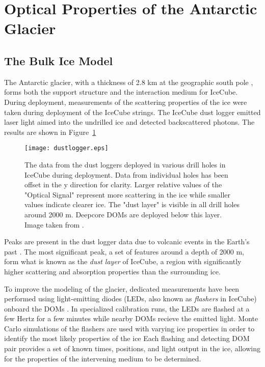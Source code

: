 \section{Optical Properties of the Antarctic Glacier}

\label{subsec:bulk_ice}
\subsection{The Bulk Ice Model}
The Antarctic glacier, with a thickness of 2.8 km at the geographic south pole \cite{IceCube-SpiceMie}, forms both the support structure and the interaction medium for IceCube.
During deployment, measurements of the scattering properties of the ice were taken during deployment of the IceCube strings.
The IceCube dust logger emitted laser light aimed into the undrilled ice and detected backscattered photons\cite{IceCube-DustLogger1, IceCube-DustLogger2}.
The results are shown in Figure~\ref{fig:dust_logger}

\begin{figure}[h]
\texttt{[image: dustlogger.eps]} 
\caption{The data from the dust loggers deployed in various drill holes in IceCube during deployment. Data from individual holes has been offset in the y direction for clarity. Larger relative values of the "Optical Signal" represent more scattering in the ice while smaller values indicate clearer ice. The "dust layer" is visible in all drill holes around 2000 m. Deepcore DOMs are deployed below this layer. Image taken from \cite{IceCube-DustLogger-Raw}.}
\label{fig:dust_logger}
\end{figure}

Peaks are present in the dust logger data due to volcanic events in the Earth's past \cite{IceCube-DustLogger1,}.
The most significant peak, a set of features around a depth of 2000 m, form what is known as the \emph{dust layer} of IceCube, a region with significantly higher scattering and absorption properties than the surrounding ice.

To improve the modeling of the glacier, dedicated measurements have been performed using light-emitting diodes (LEDs, also known as \emph{flashers} in IceCube) onboard the DOMs \cite{IceCube-SpiceMie, Description-IceCube}.
In specialized calibration runs, the LEDs are flashed at a few Hertz for a few minutes while nearby DOMs recieve the emitted light.
Monte Carlo simulations of the flashers are used with varying ice properties in order to identify the most likely properties of the ice
Each flashing and detecting DOM pair provides a set of known times, positions, and light output in the ice, allowing for the properties of the intervening medium to be determined.

